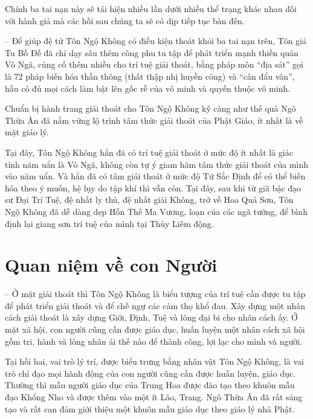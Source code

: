 Chính ba tai nạn này sẽ tái hiện nhiều lần dưới nhiều thể trạng khác nhau đối với hành giả mà các hồi sau chúng ta sẽ có dịp tiếp tục bàn đến.

-- Để giúp đệ tử Tôn Ngộ Không có điều kiện thoát khỏi ba tai nạn trên, Tôn giả Tu Bồ Đề đã chỉ dạy sâu thêm công phu tu tập để phát triển mạnh thiền quán Vô Ngã, củng cố thêm nhiều cho trí tuệ giải thoát, bằng pháp môn ``địa sát'' gọi là 72 pháp biến hóa thần thông (thất thập nhị huyền công) và ``cân đẩu vân'', hầu có đủ mọi cách làm bật lên gốc rễ của vô minh và quyến thuộc vô minh.

Chuẩn bị hành trang giải thoát cho Tôn Ngộ Không kỹ càng như thế quả Ngô Thừa Ân đã nắm vững lộ trình tâm thức giải thoát của Phật Giáo, ít nhất là về mặt giáo lý.

Tại đây, Tôn Ngộ Không hẳn đã có trí tuệ giải thoát ở mức độ ít nhất là giác tỉnh năm uẩn là Vô Ngã, không còn tự ý giam hãm tâm thức giải thoát của mình vào năm uẩn. Và hẳn đã có tâm giải thoát ở mức độ Tứ Sắc Định để có thể biến hóa theo ý muốn, hệ lụy do tập khí thì vẫn còn. Tại đây, sau khi từ giã bậc đạo sư Đại Trí Tuệ, đệ nhất ly thủ, đệ nhất giải Không, trở về Hoa Quả Sơn, Tôn Ngộ Không đã dễ dàng dẹp Hỗn Thế Ma Vương, loạn của các ngã tưởng, để bình định lại giang sơn trí tuệ của mình tại Thủy Liêm động.

\section{Quan niệm về con Người} %
\label{sec:2_quan_niem_ve_con_nguoi}

-- Ở mặt giải thoát thì Tôn Ngộ Không là biểu tượng của trí tuệ cần được tu tập để phát triển giải thoát và để chế ngự các cảm thọ khổ đau. Xây dựng một nhân cách giải thoát là xây dựng Giới, Định, Tuệ và lòng đại bi cho nhân cách ấy. Ở mặt xã hội, con người cũng cần được giáo dục, huấn luyện một nhân cách xã hội gồm tri, hành và lòng nhân ái thế nào để thành công, lợi lạc cho mình và người.

Tại hồi hai, vai trò lý trí, được biểu trưng bằng nhân vật Tôn Ngộ Không, là vai trò chỉ đạo mọi hành động của con người cũng cần được huấn luyện, giáo dục. Thường thì mẫu người giáo dục của Trung Hoa được đào tạo theo khuôn mẫu đạo Khổng Nho và được thêm vào một ít Lão, Trang. Ngô Thừa Ân đã rất sáng tạo và rất can đảm giới thiệu một khuôn mẫu giáo dục theo giáo lý nhà Phật.

